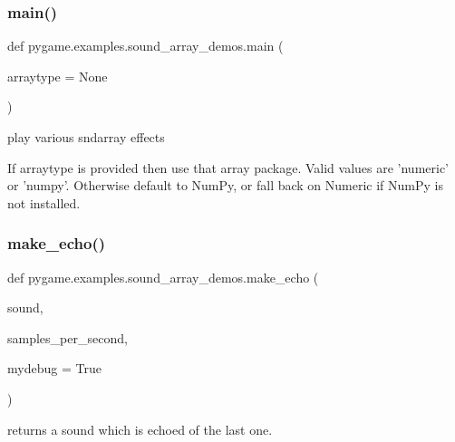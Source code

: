 \subsubsection{\texorpdfstring{main()}{main()}}
{\footnotesize\ttfamily def pygame.\+examples.\+sound\+\_\+array\+\_\+demos.\+main (\begin{DoxyParamCaption}\item[{}]{arraytype = {\ttfamily None} }\end{DoxyParamCaption})}

\begin{DoxyVerb}play various sndarray effects

If arraytype is provided then use that array package. Valid
values are 'numeric' or 'numpy'. Otherwise default to NumPy,
or fall back on Numeric if NumPy is not installed.\end{DoxyVerb}
 \mbox{\label{namespacepygame_1_1examples_1_1sound__array__demos_abf020bfb096e724a14937f3b4e1d41e8}} 
\subsubsection{\texorpdfstring{make\+\_\+echo()}{make\_echo()}}
{\footnotesize\ttfamily def pygame.\+examples.\+sound\+\_\+array\+\_\+demos.\+make\+\_\+echo (\begin{DoxyParamCaption}\item[{}]{sound,  }\item[{}]{samples\+\_\+per\+\_\+second,  }\item[{}]{mydebug = {\ttfamily True} }\end{DoxyParamCaption})}

\begin{DoxyVerb}returns a sound which is echoed of the last one.
\end{DoxyVerb}
 \mbox{\label{namespacepygame_1_1examples_1_1sound__array__demos_a5538155e0ecd86e2a7f99769b0846f0f}} 
